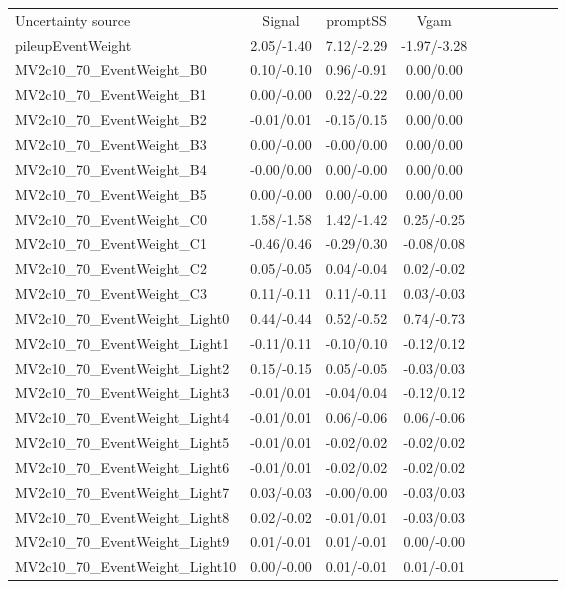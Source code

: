 \begin{table}[h]
\scriptsize
\begin{center}
\begin{tabular}{l|ccccccccc}
\hline
\hline
Uncertainty source &Signal &promptSS &Vgam \\
pileupEventWeight &2.05/-1.40 &7.12/-2.29 &-1.97/-3.28 \\
MV2c10\_70\_EventWeight\_B0 &0.10/-0.10 &0.96/-0.91 &0.00/0.00 \\
MV2c10\_70\_EventWeight\_B1 &0.00/-0.00 &0.22/-0.22 &0.00/0.00 \\
MV2c10\_70\_EventWeight\_B2 &-0.01/0.01 &-0.15/0.15 &0.00/0.00 \\
MV2c10\_70\_EventWeight\_B3 &0.00/-0.00 &-0.00/0.00 &0.00/0.00 \\
MV2c10\_70\_EventWeight\_B4 &-0.00/0.00 &0.00/-0.00 &0.00/0.00 \\
MV2c10\_70\_EventWeight\_B5 &0.00/-0.00 &0.00/-0.00 &0.00/0.00 \\
MV2c10\_70\_EventWeight\_C0 &1.58/-1.58 &1.42/-1.42 &0.25/-0.25 \\
MV2c10\_70\_EventWeight\_C1 &-0.46/0.46 &-0.29/0.30 &-0.08/0.08 \\
MV2c10\_70\_EventWeight\_C2 &0.05/-0.05 &0.04/-0.04 &0.02/-0.02 \\
MV2c10\_70\_EventWeight\_C3 &0.11/-0.11 &0.11/-0.11 &0.03/-0.03 \\
MV2c10\_70\_EventWeight\_Light0 &0.44/-0.44 &0.52/-0.52 &0.74/-0.73 \\
MV2c10\_70\_EventWeight\_Light1 &-0.11/0.11 &-0.10/0.10 &-0.12/0.12 \\
MV2c10\_70\_EventWeight\_Light2 &0.15/-0.15 &0.05/-0.05 &-0.03/0.03 \\
MV2c10\_70\_EventWeight\_Light3 &-0.01/0.01 &-0.04/0.04 &-0.12/0.12 \\
MV2c10\_70\_EventWeight\_Light4 &-0.01/0.01 &0.06/-0.06 &0.06/-0.06 \\
MV2c10\_70\_EventWeight\_Light5 &-0.01/0.01 &-0.02/0.02 &-0.02/0.02 \\
MV2c10\_70\_EventWeight\_Light6 &-0.01/0.01 &-0.02/0.02 &-0.02/0.02 \\
MV2c10\_70\_EventWeight\_Light7 &0.03/-0.03 &-0.00/0.00 &-0.03/0.03 \\
MV2c10\_70\_EventWeight\_Light8 &0.02/-0.02 &-0.01/0.01 &-0.03/0.03 \\
MV2c10\_70\_EventWeight\_Light9 &0.01/-0.01 &0.01/-0.01 &0.00/-0.00 \\
MV2c10\_70\_EventWeight\_Light10 &0.00/-0.00 &0.01/-0.01 &0.01/-0.01 \\

\end{tabular}
\end{center}
\end{table}
